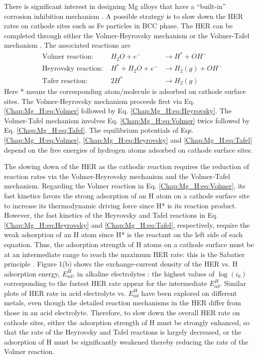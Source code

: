 There is significant interest in designing Mg alloys that have a “built-in” corrosion inhibition mechanism \cite{eaves2012inhibition}. A possible strategy is to slow down the HER rates on cathode sites such as Fe particles in \ac{BCC} phase. The HER can be completed through either the Volmer-Heyrovsky mechanism or the Volmer-Tafel mechanism \cite{ghali2010corrosion,walling1968electrochemical}. The associated reactions are
\begin{subequations}
\begin{align}
&\text{Volmer reaction:    } & H_2O + e^- & \rightarrow H^* + OH^-
 \label{Chap:Mg_H:eq:Volmer}\\
&\text{Heyrovsky reaction:    } & H^* + H_2O + e^- & \rightarrow H_2(g) + OH^-
 \label{Chap:Mg_H:eq:Heyrovsky}\\
&\text{Tafer reaction:    } 
& 2H^* & \rightarrow H_2(g)
 \label{Chap:Mg_H:eq:Tafel}
\end{align}
\end{subequations}
Here * means the corresponding atom/molecule is adsorbed on cathode surface sites. The Volmer-Heyrovsky mechanism proceeds first via Eq. \ref{Chap:Mg_H:eq:Volmer} followed by Eq. \ref{Chap:Mg_H:eq:Heyrovsky}. The Volmer-Tafel mechanism involves Eq. \ref{Chap:Mg_H:eq:Volmer} twice followed by Eq. \ref{Chap:Mg_H:eq:Tafel}. The equilibrium potentials of Eqs. \ref{Chap:Mg_H:eq:Volmer}, \ref{Chap:Mg_H:eq:Heyrovsky} and \ref{Chap:Mg_H:eq:Tafel} depend on the free energies of hydrogen atoms adsorbed on cathode surface sites. 

The slowing down of the HER as the cathodic reaction requires the reduction of reaction rates via the Volmer-Heyrovsky mechanism and the Volmer-Tafel mechanism. Regarding the Volmer reaction in Eq. \ref{Chap:Mg_H:eq:Volmer}, its fast kinetics favors the strong adsorption of an H atom on a cathode surface site to increase its thermodynamic driving force since H* is its reaction product. However, the fast kinetics of the Heyrovsky and Tafel reactions in Eq. \ref{Chap:Mg_H:eq:Heyrovsky} and \ref{Chap:Mg_H:eq:Tafel}, respectively, require the weak adsorption of an H atom since H* is the reactant on the left side of each equation. Thus, the adsorption strength of H atoms on a cathode surface must be at an intermediate range to reach the maximum \ac{HER} rate: this is the Sabatier principle \cite{medford2015sabatier}. Figure 1(b) shows the exchange-current density of the \ac{HER} vs. H adsorption energy, $E_{ad}^H$, in alkaline electrolytes \cite{sheng2013correlating}: the highest values of $\log(i_0)$ corresponding to the fastest \ac{HER} rate appear for the intermediate $E_{ad}^H$. Similar plots of \ac{HER} rate in acid electrolyte vs. $E_{ad}^H$ have been explored on different metals, even though the detailed reaction mechanisms in the \ac{HER} differ from those in an acid electrolyte. Therefore, to slow down the overall \ac{HER} rate on cathode sites, either the adsorption strength of H must be strongly enhanced, so that the rate of the Heyrovsky and Tafel reactions is largely decreased, or the adsorption of H must be significantly weakened thereby reducing the rate of the Volmer reaction. 

